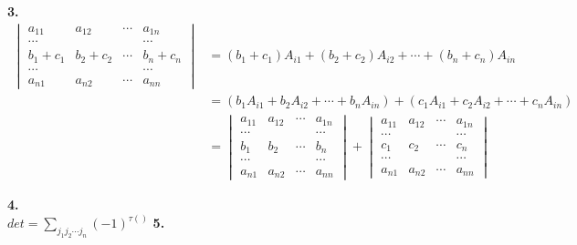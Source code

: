 \documentclass{article}
\begin{document}
\textbf{3.}
\begin{align*}
\begin{vmatrix}
    a_{11} & a_{12} & \cdots & a_{1n}\\
    \cdots &  &  & \cdots\\
    b_{1}+c_{1} & b_{2}+c_{2} & \cdots & b_{n}+c_{n}\\
    \cdots &  &  & \cdots\\
    a_{n1} & a_{n2} & \cdots & a_{nn}
\end{vmatrix}
& = (b_{1}+c_{1})A_{i1} + (b_{2}+c_{2})A_{i2} + \cdots + (b_{n}+c_{n})A_{in} \\
& = (b_{1}A_{i1} + b_{2}A_{i2} + \cdots + b_{n}A_{in}) + (c_{1}A_{i1} + c_{2}A_{i2} + \cdots + c_{n}A_{in}) \\
& = \begin{vmatrix}
    a_{11} & a_{12} & \cdots & a_{1n}\\
    \cdots &  &  & \cdots\\
    b_{1} & b_{2} & \cdots & b_{n}\\
    \cdots &  &  & \cdots\\
    a_{n1} & a_{n2} & \cdots & a_{nn}
\end{vmatrix}
+ \begin{vmatrix}
    a_{11} & a_{12} & \cdots & a_{1n}\\
    \cdots &  &  & \cdots\\
    c_{1} & c_{2} & \cdots & c_{n}\\
    \cdots &  &  & \cdots\\
    a_{n1} & a_{n2} & \cdots & a_{nn}
\end{vmatrix}
\end{align*}

\textbf{4.}\\
$det = \sum_{j_{1}j_{2}\cdots j_{n}}(-1)^{\tau ()}$
\textbf{5.}\\
\end{document}
